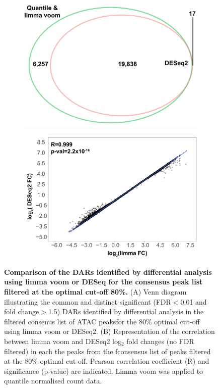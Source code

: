 \begin{figure}[htbp]
\centering
\begin{subfigure}{0.5\textwidth}
\centering
\includegraphics[width=\textwidth]{./Results1/pdfs/ATAC_Core_fresh_CD4vsCD14_venn_diagram_differential_analysis_FDR_01_quantile_DESeq2_only}
\caption{\textbf{}}
\end{subfigure}
\begin{subfigure}{0.5\textwidth}
\centering
\includegraphics[width=\textwidth]{./Results1/pdfs/ATAC_Core_fastq_CD4_CD14_80pcnt_cut_off_correlation_log2FC_quantile_vs_deseq2}
\caption{\textbf{}} %
\end{subfigure}
\caption[Comparison of the DARs identified by differential analysis using limma voom or DESeq for the consensus peak list filtered at the optimal cut-off 80\%.]{\textbf{Comparison of the DARs identified by differential analysis using limma voom or DESeq for the consensus peak list filtered at the optimal cut-off 80\%.} (A) Venn diagram illustrating the common and distinct significant (FDR$<$0.01 and fold change$>$1.5) DARs identified by differential analysis in the filtered consenus list of ATAC peaksfor the 80\% optimal cut-off using limma voom or DESeq2. (B) Representation of the correlation between limma voom and DESeq2 log$_2$ fold changes (no FDR filtered) in each the peaks from the fconsensus list of peaks filtered at the 80\% optimal cut-off. Pearson correlation coefficient (R) and significance (p-value) are indicated. Limma voom was applied to quantile normalised count data.}

\end{figure}
